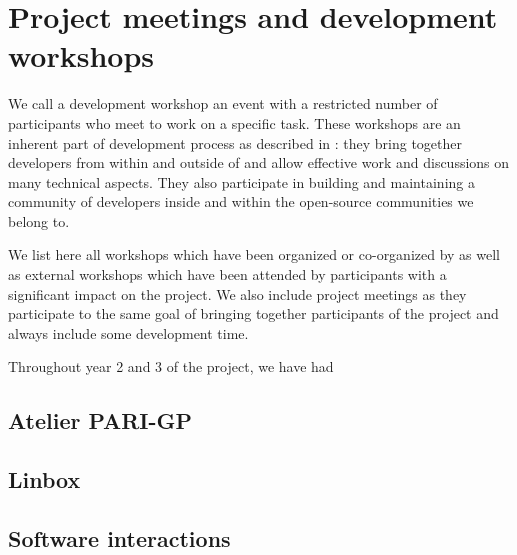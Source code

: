 \documentclass{deliverablereport}
\author{Viviane Pons et al.}
\begin{document}
\enlargethispage{4ex}
\maketitle
\githubissuedescription
\tableofcontents
\newpage


\section{Project meetings and development workshops}

We call a development workshop an event with a restricted number of participants
who meet to work on a specific task. These workshops are an inherent part
of \ODK development process as described in :
 they bring together
developers from within and outside of \ODK and allow effective work
and discussions on many technical aspects. They also participate in building
and maintaining a community of developers inside \ODK and within the
open-source communities we belong to.

We list here all workshops which have been organized or co-organized by \ODK
as well as external workshops which have been attended by \ODK participants
with a significant impact on the project. We also include project meetings as they
participate to the same goal of bringing together participants of the project and
always include some development time.

Throughout year 2 and 3 of the project, we have had

\subsection{Atelier PARI-GP}







\subsection{Linbox}





\subsection{Software interactions}
\end{document}
